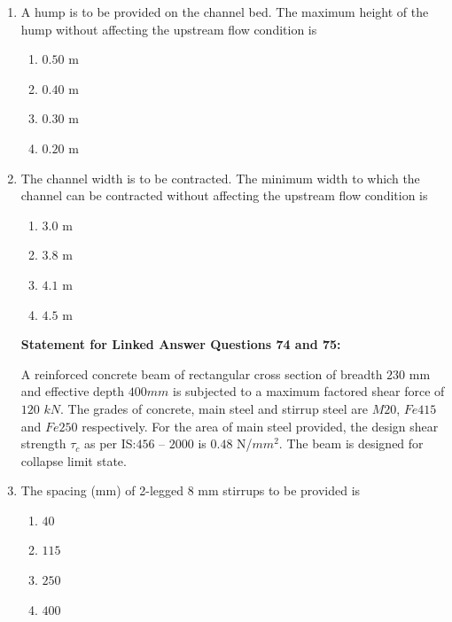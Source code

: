 \documentclass[journal]{IEEEtran}
\begin{document}
\begin{enumerate}
\vspace{0.3cm}

\item A hump is to be provided on the channel bed. The maximum height of the hump without affecting the upstream flow condition is \hfill {}

\begin{enumerate}
\item $0.50$ m
\item $0.40$ m
\item $0.30$ m
\item $0.20$ m
\end{enumerate}

\vspace{0.3cm}

\item The channel width is to be contracted. The minimum width to which the channel can be contracted without affecting the upstream flow condition is \hfill {}

\begin{enumerate}
\item $3.0$ m
\item $3.8$ m
\item $4.1$ m
\item $4.5$ m
\end{enumerate}

\vspace{1cm}

\textbf{Statement for Linked Answer Questions 74 and 75:}

A reinforced concrete beam of rectangular cross section of breadth $230$ mm and effective depth $400 mm$ is subjected to a maximum factored shear force of $120$ $kN$. The grades of concrete, main steel and stirrup steel are $M20$, $Fe415$ and $Fe250$ respectively. For the area of main steel provided, the design shear strength $\tau_c$ as per IS:$456$ --  $2000$ is $0.48$ N/$mm^{2}$. The beam is designed for collapse limit state.

\vspace{0.5cm}

\item The spacing (mm) of 2-legged 8 mm stirrups to be provided is \hfill {}
\begin{enumerate}
\item $40$
\item $115$
\item $250$
\item $400$
\end{enumerate}


\end{enumerate}
\end{document}
